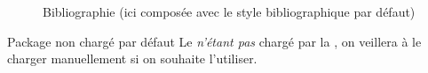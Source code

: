\begin{figure}[htbp]
  \centering
  \caption[Bibliographie]{Bibliographie (ici composée avec le style
    bibliographique par défaut)}
  \label{fig:printbibliography}
\end{figure}

\begin{dbwarning}{Package  non chargé par défaut}{}
  Le  \emph{n'étant pas} chargé par la \yatcl, on veillera
  à le charger manuellement si on souhaite l'utiliser.
\end{dbwarning}

%
\iffalse
\fi

